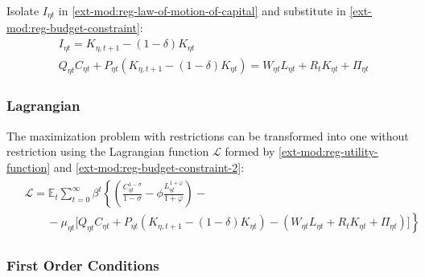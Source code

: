\documentclass[../thesis.tex]{subfiles}
\begin{document}
	Isolate $I_{\eta t}$ in \ref{ext-mod:reg-law-of-motion-of-capital} and substitute in \ref{ext-mod:reg-budget-constraint}:
	\begin{align}
		& I_{\eta t} = K_{\eta,t+1} - (1 - \delta) K_{\eta t} \label{ext-mod:reg-law-of-motion-of-capital-2} \\
		& Q_{\eta t} C_{\eta t} + P_{\eta t} (K_{\eta,t+1} - (1 - \delta) K_{\eta t}) = W_{\eta t} L_{\eta t} + R_{t} K_{\eta t} + \Pi_{\eta t} \label{ext-mod:reg-budget-constraint-2}
	\end{align}

\subsubsection*{Lagrangian}

	The maximization problem with restrictions can be transformed into one without restriction using the Lagrangian function $\mathcal{L}$ formed by \ref{ext-mod:reg-utility-function} and \ref{ext-mod:reg-budget-constraint-2}:
	\begin{align}
		\begin{split}
		& \mathcal{L} = \mathbb{E}_t \sum_{t=0}^{\infty} \beta^t \left\{ \left( \frac{C_{\eta t}^{1 -\sigma}}{1 -\sigma} - \phi \frac{L_{\eta t}^{1+\varphi}}{1+\varphi} \right) \right. - 
		\\ & \qquad - \left. \mu_{\eta t} \Big[ Q_{\eta t} C_{\eta t} + P_{\eta t} (K_{\eta,t+1} - (1 - \delta) K_{\eta t}) - (W_{\eta t} L_{\eta t} + R_{t} K_{\eta t} + \Pi_{\eta t}) \Big] \right\} \label{ext-mod:reg-household-lagrangian}
		\end{split}
	\end{align}

\subsubsection*{First Order Conditions}
\end{document}
